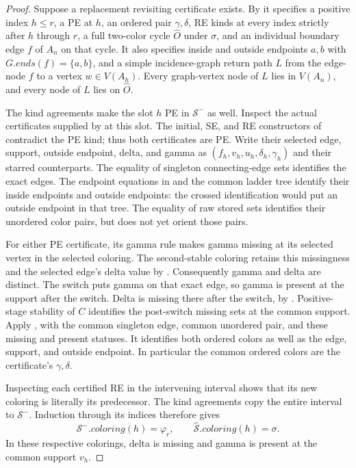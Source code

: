 \begin{proof}
Suppose a replacement revisiting certificate exists.  By
 it specifies a positive index
$h\leq r$, a PE at $h$, an ordered pair $\gamma,\delta$, RE kinds at
every index strictly after $h$ through $r$, a full two-color cycle
$\widehat O$ under $\sigma$, and an individual boundary edge $f$ of
$A_n$ on that cycle.  It also specifies inside and outside endpoints
$a,b$ with $G.\mathit{ends}(f)=\{a,b\}$, and a simple incidence-graph
return path $L$ from the edge-node $f$ to a vertex $w\in V(A_h)$.
Every graph-vertex node of $L$ lies in $V(A_n)$, and every node of $L$
lies on $\widehat O$.

The kind agreements make the slot $h$ PE in $\mathcal S^-$ as well.
Inspect the actual certificates supplied by 
at this slot.  The initial, SE, and RE constructors of
 contradict the PE kind; thus both
certificates are PE.  Write their selected edge, support, outside
endpoint, delta, and gamma as
$(f_h,v_h,u_h,\delta_h,\gamma_h)$ and their starred counterparts.
The equality of singleton connecting-edge sets identifies the exact
edges.  The endpoint equations in 
and the common ladder tree identify their inside endpoints and outside
endpoints: the crossed identification would put an outside endpoint in
that tree.  The equality of raw stored sets identifies their unordered
color pairs, but does not yet orient those pairs.

For either PE certificate, its gamma rule
 makes gamma missing at its selected
vertex in the selected coloring.  The second-stable coloring retains
this missingness and the selected edge's delta value by
.  Consequently gamma and delta are distinct.
The switch  puts gamma on that exact
edge, so gamma is present at the support after the switch.  Delta is
missing there after the switch, by
.  Positive-stage
stability of $C$ identifies the post-switch missing sets at the common
support.  Apply , with the
common singleton edge, common unordered pair, and these missing and
present statuses.  It identifies both ordered colors as well as the
edge, support, and outside endpoint.  In particular the common ordered
colors are the certificate's $\gamma,\delta$.

Inspecting each certified RE in the intervening interval shows that its
new coloring is literally its predecessor.  The kind agreements copy
the entire interval to $\mathcal S^-$.  Induction through its indices
therefore gives
\[
 \mathcal S^-.\mathit{coloring}(h)=\varphi_r,\qquad
 \widehat{\mathcal S}.\mathit{coloring}(h)=\sigma.
\]
In these respective colorings, delta is missing and gamma is present at
the common support $v_h$.


\end{proof}
